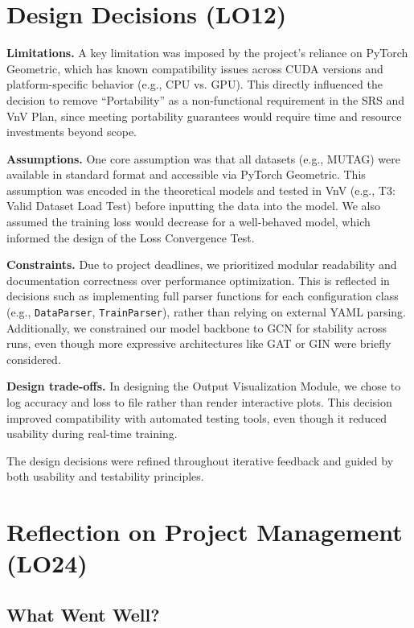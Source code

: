 \documentclass{article}
\begin{document}
\section{Design Decisions (LO12)}

\textbf{Limitations.} A key limitation was imposed by the project’s reliance on PyTorch Geometric, which has known compatibility issues across CUDA versions and platform-specific behavior (e.g., CPU vs. GPU). This directly influenced the decision to remove “Portability” as a non-functional requirement in the SRS and VnV Plan, since meeting portability guarantees would require time and resource investments beyond scope.

\textbf{Assumptions.} One core assumption was that all datasets (e.g., MUTAG) were available in standard format and accessible via PyTorch Geometric. This assumption was encoded in the theoretical models and tested in VnV (e.g., T3: Valid Dataset Load Test) before inputting the data into the model. We also assumed the training loss would decrease for a well-behaved model, which informed the design of the Loss Convergence Test.

\textbf{Constraints.} Due to project deadlines, we prioritized modular readability and documentation correctness over performance optimization. This is reflected in decisions such as implementing full parser functions for each configuration class (e.g., \texttt{DataParser}, \texttt{TrainParser}), rather than relying on external YAML parsing. Additionally, we constrained our model backbone to GCN for stability across runs, even though more expressive architectures like GAT or GIN were briefly considered.

\textbf{Design trade-offs.} In designing the Output Visualization Module, we chose to log accuracy and loss to file rather than render interactive plots. This decision improved compatibility with automated testing tools, even though it reduced usability during real-time training.

The design decisions were refined throughout iterative feedback and guided by both usability and testability principles.


\section{Reflection on Project Management (LO24)}

\subsection{What Went Well?}
\end{document}
